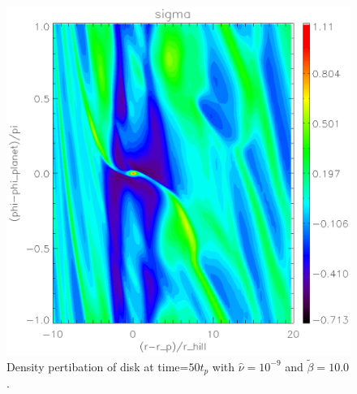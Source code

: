 \begin{figure}
   \includegraphics[scale=.60]{figures/analysis_sigma50highb.ps}
   \caption{Density pertibation of disk at time=$50t_p$ with $\hat{\nu}=10^{-9}$ and $\tilde{\beta}=10.0$. }
 \label{shortterm_highb)}
 \end{figure}












